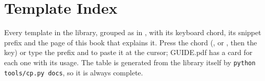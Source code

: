 \chapter{Template Index}\label{ch:templates}

Every template in the library, grouped as in , with its keyboard chord, its snippet prefix and the page of
this book that explains it. Press the chord (,  or , then the key) or
type the prefix and  to paste it at the cursor; GUIDE.pdf has a card for each one with its usage. The table is
generated from the library itself by \texttt{python tools/cp.py docs}, so it is always complete.


